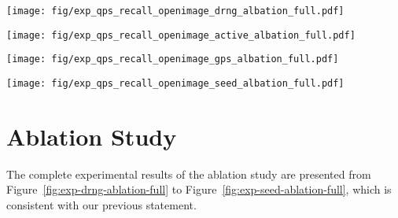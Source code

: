 \begin{figure*}[!htbp]
\centering
\texttt{[image: fig/exp\_qps\_recall\_openimage\_drng\_albation\_full.pdf]}
\caption{}
\label{fig:exp-drng-ablation-full}
\end{figure*}

\begin{figure*}[!htbp]
\centering
\texttt{[image: fig/exp\_qps\_recall\_openimage\_active\_albation\_full.pdf]}
\caption{}
\label{fig:exp-active-range-ablation-full}
\end{figure*}

\begin{figure*}[!htbp]
\centering
\texttt{[image: fig/exp\_qps\_recall\_openimage\_gps\_albation\_full.pdf]}
\caption{}
\label{fig:exp-gps-ablation-full}
\end{figure*}

\begin{figure*}[!htbp]
\centering
\texttt{[image: fig/exp\_qps\_recall\_openimage\_seed\_albation\_full.pdf]}
\caption{}
\label{fig:exp-seed-ablation-full}
\end{figure*}

\section{Ablation Study}
The complete experimental results of the ablation study are presented from Figure~\ref{fig:exp-drng-ablation-full} to Figure~\ref{fig:exp-seed-ablation-full}, which is consistent with our previous statement.



